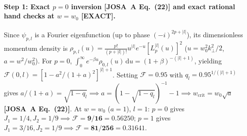 \documentclass[10pt,letterpaper]{article}
\newcommand{\abs}[1]{\lvert #1 \rvert}
\newcommand{\dd}{\mathrm{d}}
\newcommand{\josa}[1]{\textbf{[JOSA~A Eq.~(#1)]}}
\newcommand{\tagexact}{\textcolor{forest}{\textbf{[EXACT]}}}
\numberwithin{equation}{section}
\begin{document}
\paragraph*{Step 1: Exact $p = 0$ inversion \josa{22} and exact rational hand checks at $w = w_0$ \tagexact{}.}
Since $\psi_{p,l}$ is a Fourier eigenfunction (up to phase $(-i)^{2p+\abs{l}}$), its dimensionless momentum density is $\rho_{p,l}(u) = \frac{p!}{(p+\abs{l})!} u^{\abs{l}} e^{-u}[L_p^{\abs{l}}(u)]^2$ ($u = w_0^2 k_\perp^2/2$, $a = w^2/w_0^2$). For $p = 0$, $\int_0^\infty e^{-\beta u}\rho_{0,l}(u)\,\dd u = (1+\beta)^{-(\abs{l}+1)}$, yielding $\mathcal{F}(0,l) = [1 - a^2/(1+a)^2]^{\abs{l}+1}$. Setting $\mathcal{F} = 0.95$ with $q_l = 0.95^{1/(\abs{l}+1)}$ gives $a/(1+a) = \sqrt{1-q_l} \implies a = (1-\sqrt{1-q_l})^{-1} - 1 \implies w_{\mathrm{crit}} = w_0\sqrt{a}$ \josa{22}. At $w = w_0$ ($a=1$), $l=1$: $p=0$ gives $J_1 = 1/4, J_2 = 1/9 \implies \mathcal{F} = \mathbf{9/16 = 0.56250}$; $p=1$ gives $J_1 = 3/16, J_2 = 1/9 \implies \mathcal{F} = \mathbf{81/256 = 0.31641}$.
\end{document}
